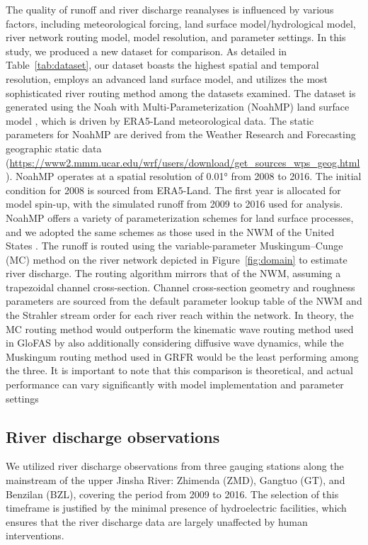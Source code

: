 \documentclass[preprint, review, authoryear, longtitle, 12pt, 3p]{elsarticle}
\begin{document}
The quality of runoff and river discharge reanalyses is influenced by various factors, including meteorological forcing, land surface model/hydrological model, river network routing model, model resolution, and parameter settings. In this study, we produced a new dataset for comparison. As detailed in Table~\ref{tab:dataset}, our dataset boasts the highest spatial and temporal resolution, employs an advanced land surface model, and utilizes the most sophisticated river routing method among the datasets examined. The dataset is generated using the Noah with Multi-Parameterization (NoahMP) land surface model \citep{niu2011JGRA}, which is driven by ERA5-Land meteorological data. The static parameters for NoahMP are derived from the Weather Research and Forecasting geographic static data (\url{https://www2.mmm.ucar.edu/wrf/users/download/get_sources_wps_geog.html}). NoahMP operates at a spatial resolution of 0.01° from 2008 to 2016. The initial condition for 2008 is sourced from ERA5-Land. The first year is allocated for model spin-up, with the simulated runoff from 2009 to 2016 used for analysis. NoahMP offers a variety of parameterization schemes for land surface processes, and we adopted the same schemes as those used in the NWM of the United States \citep{cosgrove2024JAWRA}. The runoff is routed using the variable-parameter Muskingum--Cunge (MC) method on the river network depicted in Figure~\ref{fig:domain} to estimate river discharge. The routing algorithm mirrors that of the NWM, assuming a trapezoidal channel cross-section. Channel cross-section geometry and roughness parameters are sourced from the default parameter lookup table of the NWM \citep{read2023JAWRA} and the Strahler stream order for each river reach within the network. In theory, the MC routing method would outperform the kinematic wave routing method used in GloFAS by also additionally considering diffusive wave dynamics, while the Muskingum routing method used in GRFR would be the least performing among the three. It is important to note that this comparison is theoretical, and actual performance can vary significantly with model implementation and parameter settings

\subsection{River discharge observations}\label{sec:obs}

We utilized river discharge observations from three gauging stations along the mainstream of the upper Jinsha River: Zhimenda (ZMD), Gangtuo (GT), and Benzilan (BZL), covering the period from 2009 to 2016. The selection of this timeframe is justified by the minimal presence of hydroelectric facilities, which ensures that the river discharge data are largely unaffected by human interventions.
\end{document}
